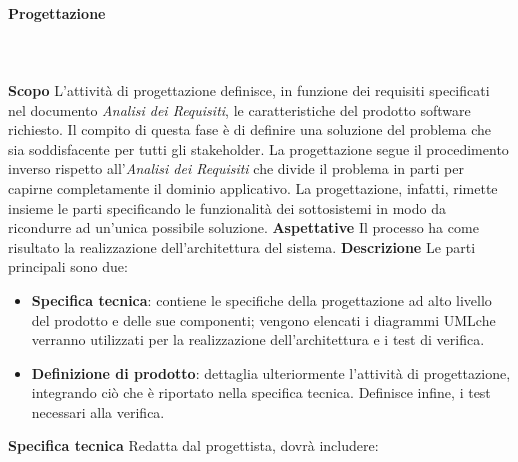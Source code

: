 		\paragraph{Progettazione} \mbox{}\\ \mbox{}\\
			\textbf{Scopo} \newline \newline
			L'attività di progettazione definisce, in funzione dei requisiti specificati nel documento \textit{Analisi dei Requisiti}, le caratteristiche del prodotto software richiesto. Il compito di questa fase è di definire una soluzione del problema che sia soddisfacente per tutti gli stakeholder. La progettazione segue il procedimento inverso rispetto all'\textit{Analisi dei Requisiti} che divide il problema in parti per capirne completamente il dominio applicativo. La progettazione, infatti, rimette insieme le parti specificando le funzionalità dei sottosistemi in modo da ricondurre ad un'unica possibile soluzione. \newline \newline
			\textbf{Aspettative} \newline \newline
			Il processo ha come risultato la realizzazione dell’architettura del sistema. \newline \newline
			\textbf{Descrizione} \newline \newline
			Le parti principali sono due:
			\begin{itemize}
				\item \textbf{Specifica tecnica}: contiene le specifiche della progettazione ad alto livello del prodotto e delle sue componenti; vengono elencati i diagrammi UML\glosp che verranno utilizzati per la realizzazione dell'architettura e i test di verifica.
				\item \textbf{Definizione di prodotto}: dettaglia ulteriormente l'attività di progettazione, integrando ciò che è riportato nella specifica tecnica. Definisce infine, i test necessari alla verifica.
			\end{itemize}
			\textbf{Specifica tecnica} \newline \newline
			Redatta dal progettista, dovrà includere:
